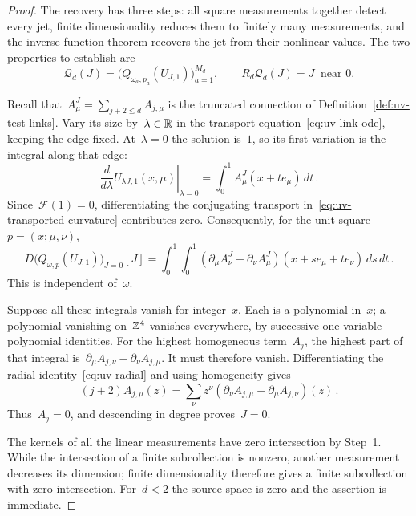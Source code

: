 \begin{proof}
The recovery has three steps: all square measurements together detect every jet, finite dimensionality reduces them to finitely many measurements, and the inverse function theorem recovers the jet from their nonlinear values.
The two properties to establish are
\begin{equation*}
 \mathcal Q_d(J)=\bigl(Q_{\omega_a,p_a}(U_{J,1})\bigr)_{a=1}^{M_d},
 \qquad R_d\mathcal Q_d(J)=J\ \text{ near }0.
\end{equation*}


Recall that~$A_\mu^J=\sum_{j+2\le d}A_{j,\mu}$ is the truncated connection of Definition~\ref{def:uv-test-links}.
Vary its size by~$\lambda\in\mathbb R$ in the transport equation~\eqref{eq:uv-link-ode}, keeping the edge fixed.
At~$\lambda=0$ the solution is~$1$, so its first variation is the integral along that edge:
\begin{equation*}
 \left.\frac{d}{d\lambda}U_{\lambda J,1}(x,\mu)\right|_{\lambda=0}
 =\int_0^1 A_\mu^J(x+te_\mu)\,dt\,.
\end{equation*}
Since~$\mathcal F(1)=0$, differentiating the conjugating transport in~\eqref{eq:uv-transported-curvature} contributes zero.
Consequently, for the unit square~$p=(x;\mu,\nu)$,
\begin{equation}\label{eq:uv-linear-square}
 D\bigl(Q_{\omega,p}(U_{J,1})\bigr)_{J=0}[J]
 =\int_0^1\!\int_0^1
   (\partial_\mu A_\nu^J-\partial_\nu A_\mu^J)(x+se_\mu+te_\nu)\,ds\,dt\,.
\end{equation}
This is independent of~$\omega$.

Suppose all these integrals vanish for integer~$x$.
Each is a polynomial in~$x$; a polynomial vanishing on~$\mathbb Z^4$ vanishes everywhere, by successive one-variable polynomial identities.
For the highest homogeneous term~$A_j$, the highest part of that integral is~$\partial_\mu A_{j,\nu}-\partial_\nu A_{j,\mu}$.
It must therefore vanish.
Differentiating the radial identity~\eqref{eq:uv-radial} and using homogeneity gives
\begin{equation}\label{eq:uv-radial-recovery}
 (j+2)A_{j,\mu}(z)
 =\sum_\nu z^\nu(\partial_\nu A_{j,\mu}-\partial_\mu A_{j,\nu})(z)\,.
\end{equation}
Thus~$A_j=0$, and descending in degree proves~$J=0$.

The kernels of all the linear measurements have zero intersection by Step~1.
While the intersection of a finite subcollection is nonzero, another measurement decreases its dimension; finite dimensionality therefore gives a finite subcollection with zero intersection.
For~$d<2$ the source space is zero and the assertion is immediate.


\end{proof}

